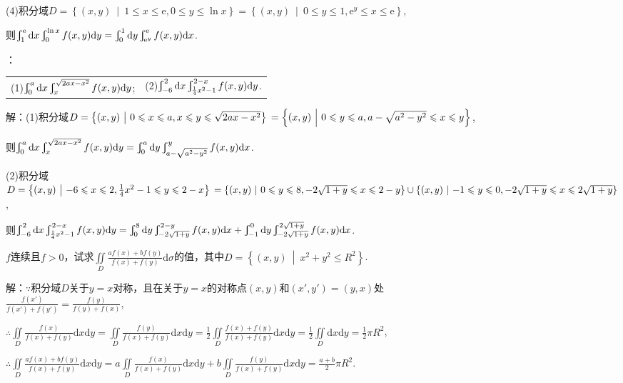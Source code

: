 \documentclass[12pt,UTF8]{ctexart}
\newcommand\Set[2]{\left\{#1\ \middle\vert\ #2 \right\}}
\newcommand{\Int}[4]{\varint\nolimits_{#1}^{#2}#3\mathrm d#4}
\newcommand{\IInt}[3]{\iint\limits_{#1}#2\mathrm d#3}
\newcommand{\varIInt}[4]{\iint\limits_{#1}#2\mathrm d#3\mathrm d#4}
\begin{document}
\begin{enumerate}
(4)积分域$D=\Set{(x,y)}{1\leqslant x\leqslant\mathrm e,0\leqslant y\leqslant\ln x}=\Set{(x,y)}{0\leqslant y\leqslant1,\mathrm e^y\leqslant x\leqslant\mathrm e}$,

则$\Int1{\mathrm e}{}x\Int0{\ln x}{f(x,y)}y=\Int01{}y\Int{\mathrm e^y}{\mathrm e}{f(x,y)}x$.

：\\
\begin{tabular}{ll}
(1)$\Int0a{}x\Int x{\sqrt{2ax-x^2}}{f(x,y)}y$;&(2)$\Int{-6}2{}x\Int{\frac14x^2-1}{2-x}{f(x,y)}y$.
\end{tabular}

解：(1)积分域$D=\Set{(x,y)}{0\leqslant x\leqslant a,x\leqslant y\leqslant\sqrt{2ax-x^2}}\\
=\Set{(x,y)}{0\leqslant y\leqslant a,a-\sqrt{a^2-y^2}\leqslant x\leqslant y}$,

则$\Int0a{}x\Int x{\sqrt{2ax-x^2}}{f(x,y)}y=\Int0a{}y\Int{a-\sqrt{a^2-y^2}}y{f(x,y)}x$.

(2)积分域$D=\Set{(x,y)}{-6\leqslant x\leqslant2,\frac14x^2-1\leqslant y\leqslant2-x}\\
=\Set{(x,y)}{0\leqslant y\leqslant8,-2\sqrt{1+y}\leqslant x\leqslant2-y}\cup\Set{(x,y)}{-1\leqslant y\leqslant0,-2\sqrt{1+y}\leqslant x\leqslant2\sqrt{1+y}}$,

则$\Int{-6}2{}x\Int{\frac14x^2-1}{2-x}{f(x,y)}y=\Int08{}y\Int{-2\sqrt{1+y}}{2-y}{f(x,y)}x+\Int{-1}0{}y\Int{-2\sqrt{1+y}}{2\sqrt{1+y}}{f(x,y)}x$.

$f$连续且$f>0$，试求$\IInt D{\frac{af(x)+bf(y)}{f(x)+f(y)}}\sigma$的值，其中$D=\Set{(x,y)}{x^2+y^2\leqslant R^2}$.

解：$\because$积分域$D$关于$y=x$对称，且在关于$y=x$的对称点$(x,y)$和$(x',y')=(y,x)$处\\
$\frac{f(x')}{f(x')+f(y')}=\frac{f(y)}{f(y)+f(x)}$,

$\therefore\varIInt D{\frac{f(x)}{f(x)+f(y)}}xy=\varIInt D{\frac{f(y)}{f(x)+f(y)}}xy=\frac12\varIInt D{\frac{f(x)+f(y)}{f(x)+f(y)}}xy=\frac12\varIInt D{}xy=\frac12\pi R^2$,

$\therefore\varIInt D{\frac{af(x)+bf(y)}{f(x)+f(y)}}xy=a\varIInt D{\frac{f(x)}{f(x)+f(y)}}xy+b\varIInt D{\frac{f(y)}{f(x)+f(y)}}xy=\frac{a+b}2\pi R^2$.

%
%
%
%
\end{enumerate}
\end{document}
